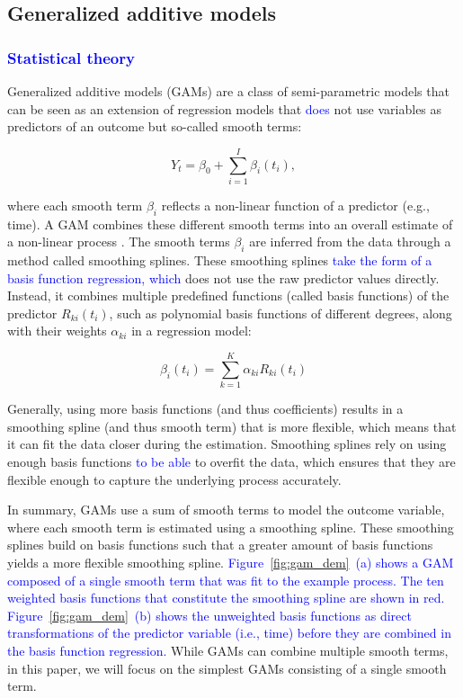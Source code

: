 \documentclass[man, floatsintext]{apa7}
\begin{document}
\subsection{Generalized additive models}

\subsubsection{\textcolor{blue}{Statistical theory}}

Generalized additive models (GAMs) are a class of semi-parametric models that
can be seen as an extension of regression models that \textcolor{blue}{does}
not use variables as predictors of an outcome but so-called smooth terms:

\begin{equation}
  Y_t = \beta_0 + \sum_{i = 1}^{I} \beta_i(t_i),
\end{equation}

\noindent where each smooth term $\beta_i$ reflects a non-linear function of a
predictor (e.g., time). A GAM combines these different smooth terms into an
overall estimate of a non-linear process \parencite{wood_generalized_2006,
  wood_inference_2020, hastie_generalized_1999}. The smooth terms $\beta_i$ are
inferred from the data through a method called smoothing splines. These
smoothing splines \textcolor{blue}{take the form of a basis function
  regression, which
} does not use the raw predictor values directly. Instead, it
combines multiple predefined functions (called basis functions) of the
predictor $R_{ki}(t_i)$, such as polynomial basis functions of different
degrees, along with their weights $\alpha_{ki}$ in a regression model:

\begin{equation}
  \beta_i(t_i) = \sum^K_{k = 1} \alpha_{ki} R_{ki}(t_i)
\end{equation}

\noindent Generally, using more basis functions (and thus coefficients) results
in a smoothing spline (and thus smooth term) that is more flexible, which means
that it can fit the data closer during the estimation. Smoothing splines rely
on using enough basis functions \textcolor{blue}{to be able} to overfit the
data, which ensures that they are flexible enough to capture the underlying
process accurately.

In summary, GAMs use a sum of smooth terms to model the
outcome variable, where each smooth term is estimated using a smoothing spline.
These smoothing splines build on basis functions such that a greater amount of
basis functions yields a more flexible smoothing spline. \textcolor{blue}{
  Figure~\ref{fig:gam_dem}~(a) shows a GAM composed of a single smooth term
  that was fit to the example process. The ten weighted basis functions that
  constitute the smoothing spline are shown in red.
  Figure~\ref{fig:gam_dem}~(b)
  shows the unweighted basis functions as direct transformations of the
  predictor variable (i.e., time) before they are combined in the basis
  function
  regression.} While GAMs can combine multiple smooth terms, in this paper, we
will focus on
the simplest GAMs consisting of a single smooth term.
\end{document}
